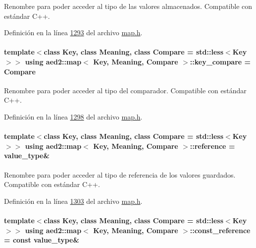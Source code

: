 Renombre para poder acceder al tipo de las valores almacenados. Compatible con estándar C++. 



Definición en la línea \hyperlink{map_8h_source_l01293}{1293} del archivo \hyperlink{map_8h_source}{map.\-h}.

\hypertarget{classaed2_1_1map_a3efa081d3379ab76f33a5ef9fe697523_a3efa081d3379ab76f33a5ef9fe697523}{
\paragraph[{key\-\_\-compare}]{\setlength{\rightskip}{0pt plus 5cm}template$<$class Key, class Meaning, class Compare = std\-::less$<$\-Key$>$$>$ using {\bf aed2\-::map}$<$ Key, Meaning, Compare $>$\-::{\bf key\-\_\-compare} =  Compare}}\label{classaed2_1_1map_a3efa081d3379ab76f33a5ef9fe697523_a3efa081d3379ab76f33a5ef9fe697523}


Renombre para poder acceder al tipo del comparador. Compatible con estándar C++. 



Definición en la línea \hyperlink{map_8h_source_l01298}{1298} del archivo \hyperlink{map_8h_source}{map.\-h}.

\hypertarget{classaed2_1_1map_af4f147533b3c0207ab036c86ce13ec0d_af4f147533b3c0207ab036c86ce13ec0d}{
\paragraph[{reference}]{\setlength{\rightskip}{0pt plus 5cm}template$<$class Key, class Meaning, class Compare = std\-::less$<$\-Key$>$$>$ using {\bf aed2\-::map}$<$ Key, Meaning, Compare $>$\-::{\bf reference} =  {\bf value\-\_\-type}\&}}\label{classaed2_1_1map_af4f147533b3c0207ab036c86ce13ec0d_af4f147533b3c0207ab036c86ce13ec0d}


Renombre para poder acceder al tipo de referencia de los valores guardados. Compatible con estándar C++. 



Definición en la línea \hyperlink{map_8h_source_l01303}{1303} del archivo \hyperlink{map_8h_source}{map.\-h}.

\hypertarget{classaed2_1_1map_a277080d3db76f19df9319ecba16475a9_a277080d3db76f19df9319ecba16475a9}{
\paragraph[{const\-\_\-reference}]{\setlength{\rightskip}{0pt plus 5cm}template$<$class Key, class Meaning, class Compare = std\-::less$<$\-Key$>$$>$ using {\bf aed2\-::map}$<$ Key, Meaning, Compare $>$\-::{\bf const\-\_\-reference} =  const {\bf value\-\_\-type}\&}}\label{classaed2_1_1map_a277080d3db76f19df9319ecba16475a9_a277080d3db76f19df9319ecba16475a9}


